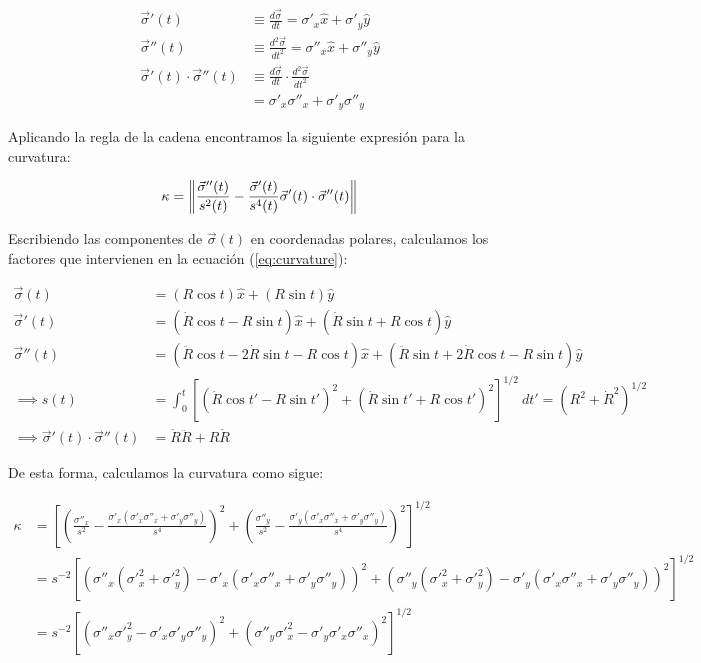 \begin{align}
  \vec{\sigma}'(t) &\equiv \frac{d\vec{\sigma}}{dt}  = \sigma'_x \hat{x} + \sigma'_y \hat{y}\\
  \vec{\sigma}''(t)&\equiv \frac{d^2\vec{\sigma}}{dt^2} = \sigma''_x \hat{x} + \sigma''_y \hat{y}\\
  \vec{\sigma}'(t)\cdot\vec{\sigma}''(t) &\equiv \frac{d\vec{\sigma}}{dt}\cdot \frac{d^2\vec{\sigma}}{dt^2}\\
   &= \sigma'_x\sigma''_x + \sigma'_y\sigma''_y
\end{align}


Aplicando la regla de la cadena encontramos la siguiente expresión para la curvatura:

\begin{align}
  \kappa = \left\lVert\frac{\vec{\sigma}''(t)}{s^2(t)} - \frac{\vec{\sigma}'(t)}{s^4(t)}
  \vec{\sigma}'(t)\cdot\vec{\sigma}''(t)\right\rVert \label{eq:curvature}
\end{align}

Escribiendo las componentes de $\vec{\sigma}(t)$ en coordenadas polares, calculamos los factores que intervienen en la
ecuación (\ref{eq:curvature}):

\begin{align}
  \vec{\sigma}(t) &= (R\cos t) \hat{x} + (R\sin t) \hat{y} \\
  \vec{\sigma}'(t) &= (\dot{R}\cos t - R\sin t)\hat{x} + (\dot{R}\sin t + R\cos t) \hat{y} \\
  \vec{\sigma}''(t) &= (\ddot{R}\cos t - 2\dot{R}\sin t - R\cos t) \hat{x} +(\ddot{R}\sin t + 2\dot{R}\cos t - R\sin t) \hat{y} \\
  \implies s(t) &= \int^t_0 \left[\left(\dot{R}\cos t' - R\sin t'\right)^2 + \left(\dot{R}\sin t' + R\cos t'\right)^2\right]^{1/2}~dt'
                  = \left(R^2 + \dot{R}^2\right)^{1/2}\\
  \implies \vec{\sigma}'(t)\cdot\vec{\sigma}''(t) &= \dot{R}\ddot{R} + R\dot{R}
\end{align}

De esta forma, calculamos la curvatura como sigue:

\begin{align}
  \kappa &= \left[\left(\frac{\sigma''_x}{s^2} - \frac{\sigma'_x(\sigma'_x\sigma''_x + \sigma'_y\sigma''_y)}{s^4}\right)^2
  + \left(\frac{\sigma''_y}{s^2} - \frac{\sigma'_y(\sigma'_x\sigma''_x + \sigma'_y\sigma''_y)}{s^4} \right)^2\right]^{1/2} \\
   &= s^{-2}\left[\left(\sigma''_x(\sigma'^2_x + \sigma'^2_y) - \sigma'_x(\sigma'_x\sigma''_x + \sigma'_y\sigma''_y)\right)^2
     + \left(\sigma''_y(\sigma'^2_x + \sigma'^2_y) - \sigma'_y(\sigma'_x\sigma''_x + \sigma'_y\sigma''_y)\right)^2 \right]^{1/2}\\
   &= s^{-2}\left[\left(\sigma''_x\sigma'^2_y - \sigma'_x\sigma'_y\sigma''_y\right)^2 +
     \left(\sigma''_y\sigma'^2_x - \sigma'_y\sigma'_x\sigma''_x\right)^2 \right]^{1/2}
\end{align}



